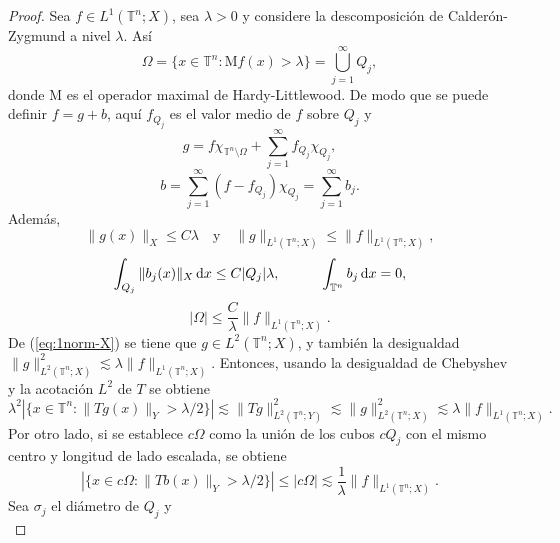 \begin{proof}
	Sea $f \in L^1(\mathbb{T}^n; X)$, sea $\lambda > 0$ y considere la descomposición de Calderón-Zygmund a nivel $\lambda$. Así
	\begin{equation*}
		\Omega = \{x \in \mathbb{T}^n : \mathrm{M}f(x) > \lambda\} = \bigcup_{j=1}^\infty Q_j,
	\end{equation*}
	donde $\mathrm{M}$ es el operador maximal de Hardy-Littlewood. De modo que se puede definir $f = g + b$, aquí $f_{Q_j}$ es el valor medio de $f$ sobre $Q_j$ y
	\begin{equation*}
		g = f\chi_{\mathbb{T}^n \setminus \Omega} + \sum_{j=1}^\infty f_{Q_j}\chi_{Q_j},
	\end{equation*}
	\begin{equation*}
		b = \sum_{j=1}^\infty(f - f_{Q_j})\chi_{Q_j} = \sum_{j=1}^\infty b_j.
	\end{equation*}
	Además,
	\begin{equation}
		\|g(x)\|_X \leq C\lambda \quad \text{y} \quad \|g\|_{L^1(\mathbb{T}^n; X)} \leq \|f\|_{L^1(\mathbb{T}^n; X)},
		\label{eq:1norm-X}
	\end{equation}
	\begin{equation}
		\int_{Q_j} \|b_j(x)\|_X \mathop{}\!\mathrm{d} x \leq C|Q_j|\lambda, \quad  \quad \quad \int_{\mathbb{T}^n} b_j \mathop{}\!\mathrm{d} x = 0,
		\label{eq:cz-condition}
	\end{equation}
	\begin{equation*}
		|\Omega| \leq \frac{C}{\lambda}\|f\|_{L^1(\mathbb{T}^n; X)}.
	\end{equation*}
	De (\ref{eq:1norm-X}) se tiene que $g \in L^2(\mathbb{T}^n; X)$, y también la desigualdad $\|g\|_{L^2(\mathbb{T}^n; X)}^2 \lesssim \lambda \|f\|_{L^1(\mathbb{T}^n; X)}$. Entonces, usando la desigualdad de Chebyshev y la acotación $L^2$ de $T$ se obtiene
	\begin{equation*}
		\lambda^2 |\{x \in \mathbb{T}^n : \|Tg(x)\|_Y > \lambda/2\}| \lesssim \|Tg\|_{L^2(\mathbb{T}^n; Y)}^2 \lesssim \|g\|_{L^2(\mathbb{T}^n; X)}^2 \lesssim \lambda\|f\|_{L^1(\mathbb{T}^n; X)}.
	\end{equation*}
	Por otro lado, si se establece $c\Omega$ como la unión de los cubos $cQ_j$ con el mismo centro y longitud de lado escalada, se obtiene
	\begin{equation*}
		|\{ x \in c\Omega : \|Tb(x)\|_Y > \lambda/2  \}| \leq |c\Omega| \lesssim \frac{1}{\lambda}\|f\|_{L^1(\mathbb{T}^n; X)}.
	\end{equation*}
	Sea $\sigma_j$ el diámetro de $Q_j$ y
	\begin{equation*}

\end{equation*}
\end{proof}
